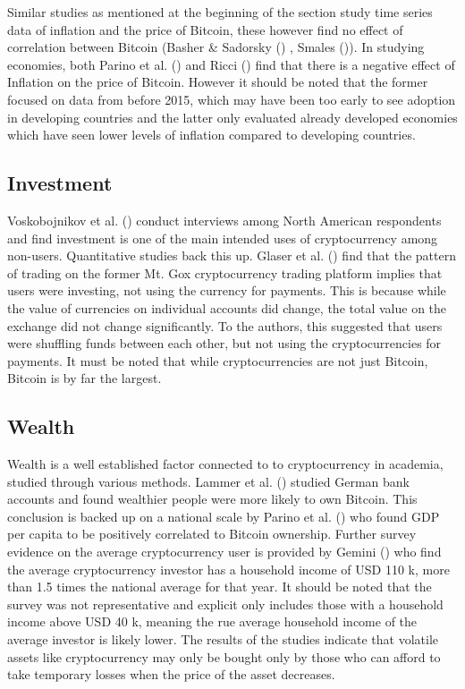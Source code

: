 \documentclass[
]{article}
\begin{document}
Similar studies as mentioned at the beginning of the section study time series data of inflation and the price of Bitcoin, these however find no effect of correlation between Bitcoin (Basher \& Sadorsky () , Smales ()). In studying economies, both Parino et al. () and Ricci () find that there is a negative effect of Inflation on the price of Bitcoin. However it should be noted that the former focused on data from before 2015, which may have been too early to see adoption in developing countries and the latter only evaluated already developed economies which have seen lower levels of inflation compared to developing countries.

\subsection{Investment}\label{investment}

Voskobojnikov et al. () conduct interviews among North American respondents and find investment is one of the main intended uses of cryptocurrency among non-users. Quantitative studies back this up. Glaser et al. () find that the pattern of trading on the former Mt. Gox cryptocurrency trading platform implies that users were investing, not using the currency for payments. This is because while the value of currencies on individual accounts did change, the total value on the exchange did not change significantly. To the authors, this suggested that users were shuffling funds between each other, but not using the cryptocurrencies for payments. It must be noted that while cryptocurrencies are not just Bitcoin, Bitcoin is by far the largest.

\subsection{Wealth}\label{wealth}

Wealth is a well established factor connected to to cryptocurrency in academia, studied through various methods. Lammer et al. () studied German bank accounts and found wealthier people were more likely to own Bitcoin. This conclusion is backed up on a national scale by Parino et al. () who found GDP per capita to be positively correlated to Bitcoin ownership. Further survey evidence on the average cryptocurrency user is provided by Gemini () who find the average cryptocurrency investor has a household income of USD 110 k, more than 1.5 times the national average for that year. It should be noted that the survey was not representative and explicit only includes those with a household income above USD 40 k, meaning the rue average household income of the average investor is likely lower. The results of the studies indicate that volatile assets like cryptocurrency may only be bought only by those who can afford to take temporary losses when the price of the asset decreases.
\end{document}
